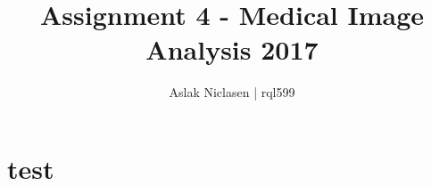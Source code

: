 \documentclass[]{article}
\title{Assignment 4 - Medical Image Analysis 2017}
\author{Aslak Niclasen | rql599}
\begin{document}
\maketitle

\section*{test}
\end{document}
